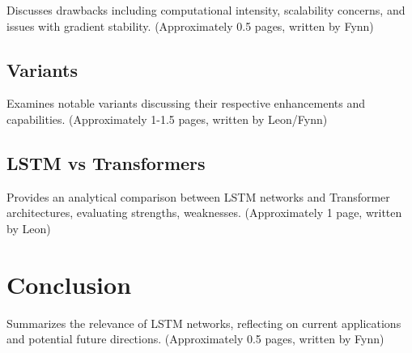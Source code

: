 \documentclass[twoside,a4paper,10pt,DIV=12,BCOR=12mm]{scrartcl}
\begin{document}
Discusses drawbacks including computational intensity, scalability concerns, and issues with gradient stability.
(Approximately 0.5 pages, written by Fynn)

\subsection{Variants}

Examines notable variants discussing their respective enhancements and capabilities.
(Approximately 1-1.5 pages, written by Leon/Fynn)

\subsection{LSTM vs Transformers}

Provides an analytical comparison between LSTM networks and Transformer architectures, evaluating strengths, weaknesses.
(Approximately 1 page, written by Leon)

\section{Conclusion}

Summarizes the relevance of LSTM networks, reflecting on current applications and potential future directions.
(Approximately 0.5 pages, written by Fynn)


% 
% 
\end{document}
